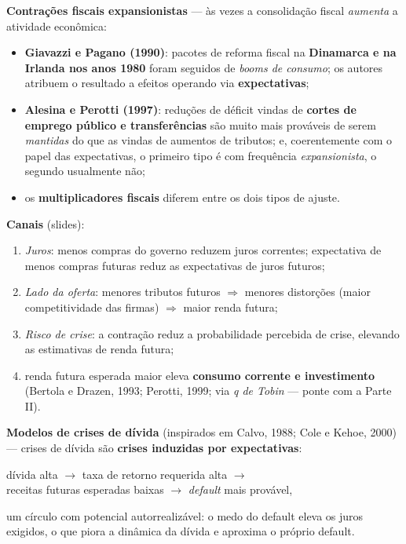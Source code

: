 \documentclass[12pt, a4paper]{article}
\begin{document}
\textbf{Contrações fiscais expansionistas} --- às vezes a consolidação fiscal
\emph{aumenta} a atividade econômica:
\begin{itemize}[leftmargin=1.4em]
\item \textbf{Giavazzi e Pagano (1990)}: pacotes de reforma fiscal na
\textbf{Dinamarca e na Irlanda nos anos 1980} foram seguidos de \emph{booms de
consumo}; os autores atribuem o resultado a efeitos operando via
\textbf{expectativas};
\item \textbf{Alesina e Perotti (1997)}: reduções de déficit vindas de
\textbf{cortes de emprego público e transferências} são muito mais prováveis
de serem \emph{mantidas} do que as vindas de aumentos de tributos; e,
coerentemente com o papel das expectativas, o primeiro tipo é com frequência
\emph{expansionista}, o segundo usualmente não;
\item os \textbf{multiplicadores fiscais} diferem entre os dois tipos de
ajuste.
\end{itemize}

\textbf{Canais} (slides):
\begin{enumerate}[leftmargin=1.6em, itemsep=0.1em]
\item[a)] \emph{Juros}: menos compras do governo reduzem juros correntes;
expectativa de menos compras futuras reduz as expectativas de juros futuros;
\item[b)] \emph{Lado da oferta}: menores tributos futuros $\Rightarrow$
menores distorções (maior competitividade das firmas) $\Rightarrow$ maior
renda futura;
\item[c)] \emph{Risco de crise}: a contração reduz a probabilidade percebida
de crise, elevando as estimativas de renda futura;
\item[d)] renda futura esperada maior eleva \textbf{consumo corrente e
investimento} (Bertola e Drazen, 1993; Perotti, 1999; via \emph{q de Tobin} ---
ponte com a Parte II).
\end{enumerate}

\textbf{Modelos de crises de dívida} (inspirados em Calvo, 1988; Cole e Kehoe,
2000) --- crises de dívida são \textbf{crises induzidas por expectativas}:
\begin{center}
dívida alta $\rightarrow$ taxa de retorno requerida alta $\rightarrow$\\
receitas futuras esperadas baixas $\rightarrow$ \emph{default} mais provável,
\end{center}
um círculo com potencial autorrealizável: o medo do default eleva os juros
exigidos, o que piora a dinâmica da dívida e aproxima o próprio default.
\end{document}
